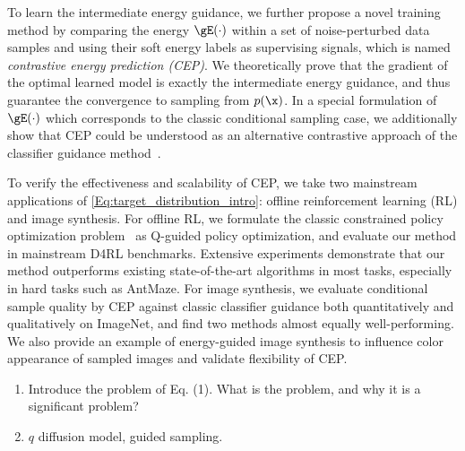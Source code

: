To learn the intermediate energy guidance, we further propose a novel training method by comparing the energy $\gE(\cdot)$ within a set of noise-perturbed data samples and using their soft energy labels as supervising signals, which is named \textit{contrastive energy prediction (CEP)}. We theoretically prove that the gradient of the optimal learned model is exactly the intermediate energy guidance, and thus guarantee the convergence to sampling from $p(\x)$. In a special formulation of $\gE(\cdot)$ which corresponds to the classic conditional sampling case, we additionally show that CEP could be understood as an alternative contrastive approach of the classifier guidance method~\citep{diffusion_beat_gan}.






To verify the effectiveness and scalability of CEP, we take two mainstream applications of \eqref{Eq:target_distribution_intro}: offline reinforcement learning (RL) and image synthesis.
For offline RL, we formulate the classic constrained policy optimization problem~\citep{rwr, awr} as Q-guided policy optimization, and evaluate our method in mainstream D4RL \citep{d4rl} benchmarks. Extensive experiments demonstrate that our method outperforms existing state-of-the-art algorithms in most tasks, especially in hard tasks such as AntMaze. For image synthesis, we evaluate conditional sample quality by CEP against classic classifier guidance \citep{diffusion_beat_gan} both quantitatively and qualitatively on ImageNet, and find two methods almost equally well-performing. We also provide an example of energy-guided image synthesis to influence color appearance of sampled images and validate flexibility of CEP.

\begin{enumerate}
    \item Introduce the problem of Eq. (1). What is the problem, and why it is a significant problem?
    \item $q$ diffusion model, guided sampling.
\end{enumerate}




